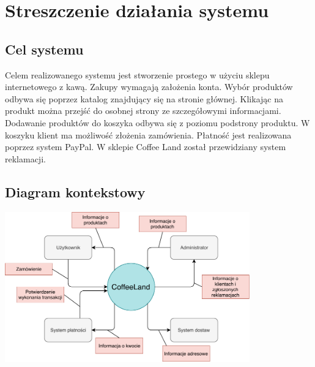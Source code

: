 \documentclass[12pt]{report}
\begin{document}
	\tableofcontents
	
	
	
	\setcounter{chapter}{0}	
	\setcounter{section}{0}	
	
	
	
	\chapter{Streszczenie działania systemu}
	
		\section{Cel systemu}
	
		Celem realizowanego systemu jest stworzenie prostego w użyciu sklepu internetowego z kawą. Zakupy wymagają założenia konta. Wybór produktów odbywa się poprzez katalog znajdujący się na stronie głównej. Klikając na produkt można przejść do osobnej strony ze szczegółowymi informacjami. Dodawanie produktów do koszyka odbywa się z poziomu podstrony produktu. W koszyku klient ma możliwość złożenia zamówienia. Płatność jest realizowana poprzez system PayPal. W sklepie Coffee Land został przewidziany system reklamacji.
	
		\section{Diagram kontekstowy}
			\begin{center}
				\includegraphics[width=300pt]{kontekstowy.pdf}
			\end{center}
	
\end{document}
